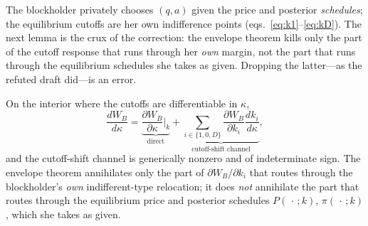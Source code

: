 The blockholder privately chooses $(q,a)$ given the price and posterior
\emph{schedules}; the equilibrium cutoffs are her own indifference points
(eqs.~\eqref{eq:k1}--\eqref{eq:kD}). The next lemma is the crux of the
correction: the envelope theorem kills only the part of the cutoff response that
runs through her \emph{own} margin, not the part that runs through the
equilibrium schedules she takes as given. Dropping the latter---as the refuted
draft did---is an error.

\begin{lemma}
\label{lem:no-env-WB}
On the interior where the cutoffs are differentiable in $\kappa$,
\begin{equation}
\frac{dW_B}{d\kappa}
 =\underbrace{\frac{\partial W_B}{\partial\kappa}\bigg|_{k}}_{\text{direct}}
 +\underbrace{\sum_{i\in\{1,0,D\}}\frac{\partial W_B}{\partial k_i}
     \frac{dk_i}{d\kappa}}_{\text{cutoff-shift channel}},
\label{eq:tot-deriv-WB}
\end{equation}
and the cutoff-shift channel is generically nonzero and of indeterminate sign.
The envelope theorem annihilates only the part of $\partial W_B/\partial k_i$
that routes through the blockholder's \emph{own} indifferent-type relocation; it
does \emph{not} annihilate the part that routes through the equilibrium price and
posterior schedules $P(\,\cdot\,;k)$, $\pi(\,\cdot\,;k)$, which she takes as given.
\end{lemma}

